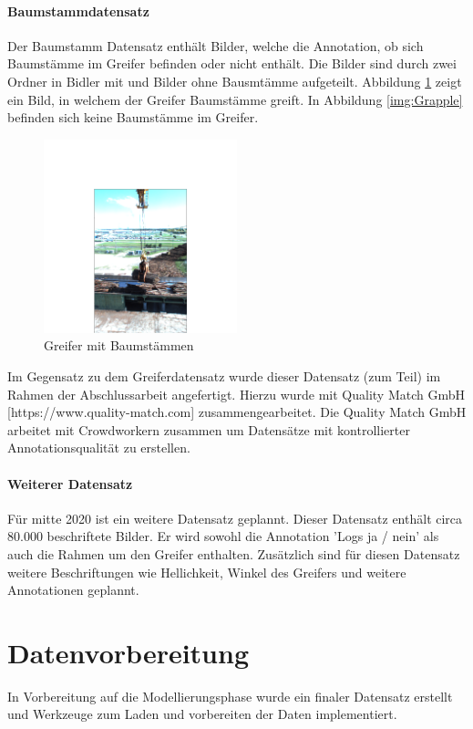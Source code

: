 	\paragraph{Baumstammdatensatz} Der Baumstamm Datensatz enthält Bilder, welche die Annotation, ob sich Baumstämme im Greifer befinden oder nicht enthält. Die Bilder sind durch zwei Ordner in Bidler mit und Bilder ohne Bausmtämme aufgeteilt.  Abbildung \ref{img:Logs} zeigt ein Bild, in welchem der Greifer Baumstämme greift. In Abbildung \ref{img:Grapple} befinden sich keine Baumstämme im Greifer.
	\begin{figure}[h]
		\centering
		\includegraphics[width=0.5\textwidth, center]{bilder/Grundlagen/Logs_14.png}
		\caption[Bsp. Bild: Greifer mit Baumstämmen]{Greifer mit Baumstämmen}
		\label{img:Logs}
	\end{figure}
	Im Gegensatz zu dem Greiferdatensatz wurde dieser Datensatz (zum Teil) im Rahmen der Abschlussarbeit angefertigt. Hierzu wurde mit Quality Match GmbH [https://www.quality-match.com] zusammengearbeitet. Die Quality Match GmbH  arbeitet mit Crowdworkern zusammen um Datensätze mit kontrollierter Annotationsqualität zu erstellen.  

	\paragraph{Weiterer Datensatz} Für mitte 2020 ist ein weitere Datensatz geplannt. Dieser Datensatz enthält circa 80.000 beschriftete Bilder. Er wird sowohl die Annotation 'Logs ja / nein' als auch die Rahmen um den Greifer enthalten. Zusätzlich sind für diesen Datensatz weitere Beschriftungen wie Hellichkeit, Winkel des Greifers und weitere Annotationen geplannt. 
			
	\section{Datenvorbereitung}
	\label{sec:DataPreparation}
	In Vorbereitung auf die Modellierungsphase wurde ein finaler Datensatz erstellt und Werkzeuge zum Laden und vorbereiten der Daten implementiert.

